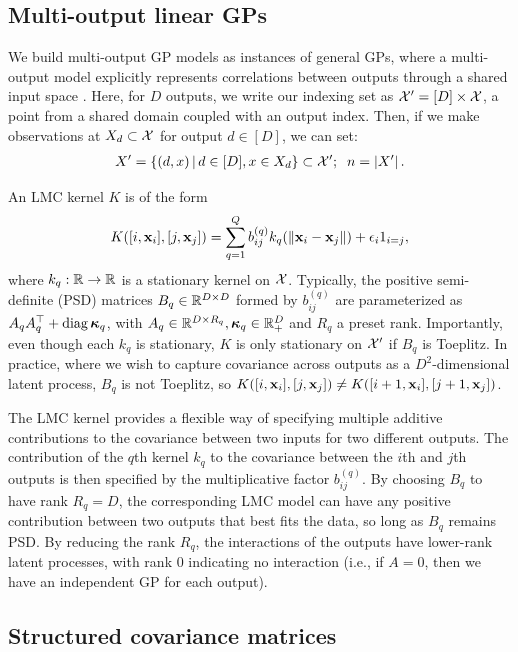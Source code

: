 \documentclass{article}
\begin{document}
\subsection{Multi-output linear GPs}

We build multi-output GP models as instances of general GPs, where a multi-output model explicitly represents correlations between outputs through a shared input space \cite{alvarez2012kernels}. Here, for $D$ outputs, we write our indexing set as $\mathcal{X}'=[D]\times \mathcal{X}$, a point from a shared domain coupled with an output index. Then, if we make observations at $X_d\subset\mathcal{X}$ for output $d\in[D]$, we can set:
\begin{align*}
X'=\left\{ (d, x) \,\middle|\, d\in[D],x\in X_d \right\}\subset{\mathcal{X}'};\;\; n=\left\vert{X'}\right\vert.
\end{align*}

An LMC kernel $K$ is of the form 
\begin{align}
K([i,\textbf{x}_i],[j,\textbf{x}_j])=\sum_{q=1}^Qb_{ij}^{(q)}k_q(\left\| \textbf{x}_i-\textbf{x}_j \right\|)+\epsilon_i1_{i=j},\label{lmcpointwise}
\end{align} 
where $k_q:\mathbb{R}\rightarrow\mathbb{R}$ is a stationary kernel on $\mathcal{X}$. Typically, the positive semi-definite (PSD) matrices $B_q\in\mathbb{R}^{D\times D}$ formed by $b_{ij}^{(q)}$ are parameterized as $A_qA_q^\top+\operatorname{diag}{\boldsymbol\kappa}_q$, with $A_q\in\mathbb{R}^{D\times R_q},{\boldsymbol\kappa}_q\in\mathbb{R}_+^D$ and $R_q$ a preset rank. Importantly, even though each $k_q$ is stationary, $K$ is only stationary on $\mathcal{X}'$ if $B_q$ is Toeplitz. In practice, where we wish to capture covariance across outputs as a $D^2$-dimensional latent process, $B_q$ is not Toeplitz, so $K([i,\textbf{x}_i],[j,\textbf{x}_j])\neq K([i+1,\textbf{x}_i],[j+1,\textbf{x}_j])$.

The LMC kernel provides a flexible way of specifying multiple additive contributions to the covariance between two inputs for two different outputs. The contribution of the $q$th kernel $k_q$ to the covariance between the $i$th and $j$th outputs is then specified by the multiplicative factor $b_{ij}^{(q)}$. By choosing $B_q$ to have rank $R_q=D$, the corresponding LMC model can have any positive contribution between two outputs that best fits the data, so long as $B_q$ remains PSD. By reducing the rank $R_q$, the interactions of the outputs have lower-rank latent processes, with rank 0 indicating no interaction (i.e., if $A=0$, then we have an independent GP for each output).

\subsection{Structured covariance matrices}
\end{document}
